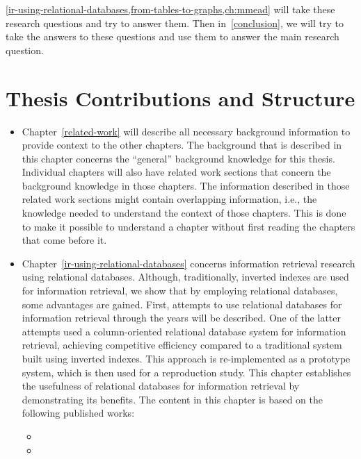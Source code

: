 \cref{ir-using-relational-databases,from-tables-to-graphs,ch:mmead} will take these research questions and try to answer them. Then in~\cref{conclusion}, we will try to take the answers to these questions and use them to answer the main research question. 

\section{Thesis Contributions and Structure}

\begin{itemize}
	\item Chapter~\ref{related-work} will describe all necessary background information to provide context to the other chapters. The background that is described in this chapter concerns the ``general'' background knowledge for this thesis. Individual chapters will also have related work sections that concern the background knowledge in those chapters. The information described in those related work sections might contain overlapping information, i.e., the knowledge needed to understand the context of those chapters. This is done to make it possible to understand a chapter without first reading the chapters that come before it. 
	
	\item Chapter~\ref{ir-using-relational-databases} concerns information retrieval research using relational databases. 
	Although, traditionally, inverted indexes are used for information retrieval, we show that by employing relational databases, some advantages are gained. 
	First, attempts to use relational databases for information retrieval through the years will be described. One of the latter attempts used a column-oriented relational database system for information retrieval, achieving competitive efficiency compared to a traditional system built using inverted indexes. This approach is re-implemented as a prototype system, which is then used for a reproduction study. This chapter establishes the usefulness of relational databases for information retrieval by demonstrating its benefits. The content in this chapter is based on the following published works: 
	
	{
		\scriptsize
		\begin{itemize}
			\item {}
			\item {}
		\end{itemize}
	}
	

\end{itemize}
